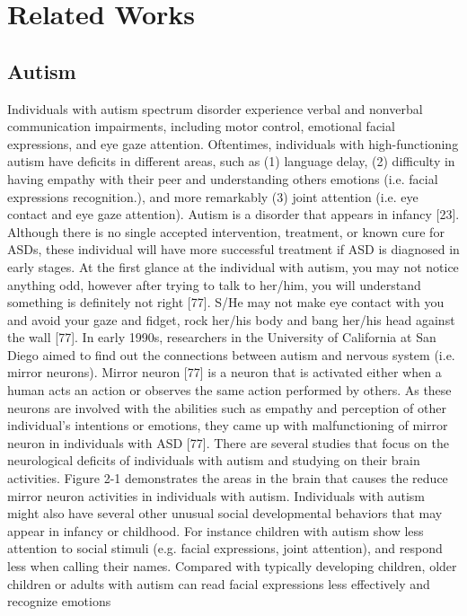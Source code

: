 \chapter{Related Works}

\section{Autism}
Individuals with autism spectrum disorder experience verbal and nonverbal
communication impairments, including motor control, emotional facial expressions, and
eye gaze attention. Oftentimes, individuals with high-functioning autism have deficits in
different areas, such as (1) language delay, (2) difficulty in having empathy with their peer
and understanding others emotions (i.e. facial expressions recognition.), and more
remarkably (3) joint attention (i.e. eye contact and eye gaze attention). Autism is a disorder
that appears in infancy [23]. Although there is no single accepted intervention, treatment,
or known cure for ASDs, these individual will have more successful treatment if ASD is
diagnosed in early stages. At the first glance at the individual with autism, you may not
notice anything odd, however after trying to talk to her/him, you will understand something
is definitely not right [77]. S/He may not make eye contact with you and avoid your gaze
and fidget, rock her/his body and bang her/his head against the wall [77].
In early 1990s, researchers in the University of California at San Diego aimed to
find out the connections between autism and nervous system (i.e. mirror neurons). Mirror
neuron [77] is a neuron that is activated either when a human acts an action or observes the
same action performed by others. As these neurons are involved with the abilities such as
empathy and perception of other individual’s intentions or emotions, they came up with 
malfunctioning of mirror neuron in individuals with ASD [77]. There are several studies
that focus on the neurological deficits of individuals with autism and studying on their
brain activities. Figure 2-1 demonstrates the areas in the brain that causes the reduce mirror
neuron activities in individuals with autism.
Individuals with autism might also have several other unusual social developmental
behaviors that may appear in infancy or childhood. For instance children with autism show
less attention to social stimuli (e.g. facial expressions, joint attention), and respond less
when calling their names. Compared with typically developing children, older children or
adults with autism can read facial expressions less effectively and recognize emotions

